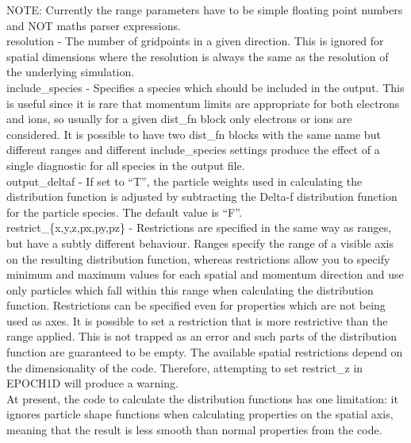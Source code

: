 {\emphtext NOTE: Currently the range parameters have to be simple floating
point numbers and NOT maths parser expressions.}\\

{\emphtext resolution} - The number of gridpoints in a given
direction. This is ignored for spatial dimensions where the
resolution is always the same as the resolution of the underlying simulation.\\

{\emphtext include\_species} - Specifies a species which should be included
in the output. This is useful since it is rare that momentum limits are
appropriate for both electrons and ions, so usually for a given dist\_fn block
only electrons or ions are considered. It is possible to have two dist\_fn
blocks with the same name but different ranges and different
include\_species settings produce the effect of a single diagnostic for
all species in the output file.\\

{\emphtext output\_deltaf} - If set to ``T'', the particle weights used in
  calculating the distribution function is adjusted by subtracting the Delta-f
  distribution function for the particle species. The default value is ``F''.\\

{\emphtext restrict\_\{x,y,z,px,py,pz\}} - Restrictions are specified in the
  same way as ranges, but have a subtly different behaviour. Ranges specify
  the range of a visible axis on the resulting distribution function, whereas
  restrictions allow you to specify minimum and maximum values for each
  spatial and momentum direction and use only particles which fall within this
  range when calculating the distribution function. Restrictions can be
  specified even
  for properties which are not being used as axes. It is possible to set a
  restriction that is more restrictive than the range applied. This is not
  trapped as an error and such parts of the distribution function are
  guaranteed to be empty. The available spatial restrictions depend on the
  dimensionality of the code. Therefore,
  attempting to set restrict\_z in EPOCH1D will produce a warning.\\

At present, the code to calculate the distribution functions has one
limitation: it ignores particle shape functions when calculating properties
on the spatial axis, meaning that the result is less smooth than normal
properties from the code.


